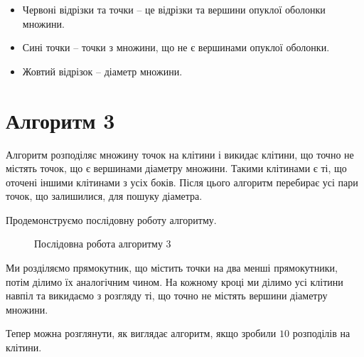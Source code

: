 \documentclass[a4paper,12pt]{article}
\begin{document}
\begin{itemize}
	\item Червоні відрізки та точки -- це відрізки та вершини опуклої оболонки множини.
	\item Сині точки -- точки з множини, що не є вершинами опуклої оболонки.
	\item  Жовтий відрізок -- діаметр множини.
\end{itemize}

\section{Алгоритм 3}

Алгоритм розподіляє множину точок на клітини і викидає клітини, що точно не містять точок, що є вершинами діаметру множини. Такими клітинами є ті, що оточені іншими клітинами з усіх боків. Після цього алгоритм перебирає усі пари точок, що залишилися, для пошуку діаметра. 

Продемонструємо послідовну роботу алгоритму.  
\newpage
\begin{figure}[h]
	\caption{Послідовна робота алгоритму 3}
	\label{fig:f2}
\end{figure}


Ми розділяємо прямокутник, що містить точки на два менші прямокутники, потім ділимо їх аналогічним чином. На кожному кроці ми ділимо усі клітини навпіл та викидаємо з розгляду ті, що точно не містять вершини діаметру множини.

Тепер можна розглянути, як виглядає алгоритм, якщо зробили $10$ розподілів на клітини.
\end{document}
